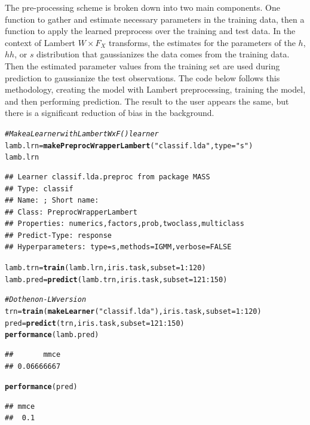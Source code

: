 \documentclass[12pt]{article}\usepackage[]{graphicx}\usepackage[]{color}
\makeatletter
\newcommand{\hlnum}[1]{\textcolor[rgb]{0.686,0.059,0.569}{#1}}%
\newcommand{\hlstr}[1]{\textcolor[rgb]{0.192,0.494,0.8}{#1}}%
\newcommand{\hlcom}[1]{\textcolor[rgb]{0.678,0.584,0.686}{\textit{#1}}}%
\newcommand{\hlopt}[1]{\textcolor[rgb]{0,0,0}{#1}}%
\newcommand{\hlstd}[1]{\textcolor[rgb]{0.345,0.345,0.345}{#1}}%
\newcommand{\hlkwb}[1]{\textcolor[rgb]{0.69,0.353,0.396}{#1}}%
\newcommand{\hlkwc}[1]{\textcolor[rgb]{0.333,0.667,0.333}{#1}}%
\newcommand{\hlkwd}[1]{\textcolor[rgb]{0.737,0.353,0.396}{\textbf{#1}}}%
\newenvironment{kframe}{%
 \def\at@end@of@kframe{}%
 \ifinner\ifhmode%
  \def\at@end@of@kframe{\end{minipage}}%
  \begin{minipage}{\columnwidth}%
 \fi\fi%
 \def\FrameCommand##1{\hskip\@totalleftmargin \hskip-\fboxsep
 \colorbox{shadecolor}{##1}\hskip-\fboxsep
     \hskip-\linewidth \hskip-\@totalleftmargin \hskip\columnwidth}%
 \MakeFramed {\advance\hsize-\width
   \@totalleftmargin\z@ \linewidth\hsize
   \@setminipage}}%
 {\par\unskip\endMakeFramed%
 \at@end@of@kframe}
\newenvironment{knitrout}{}{} %
\theoremstyle{definition}
\makeatother
\begin{document}
The pre-processing scheme is broken down into two main components. One function to gather and estimate necessary parameters in the training data, then a function to apply the learned preprocess over the training and test data. In the context of Lambert $W\times F_X$ transforms, the estimates for the parameters of the $h$, $hh$, or $s$ distribution that gaussianizes the data comes from the training data. Then the estimated parameter values from the training set are used during prediction to gaussianize the test observations. The code below follows this methodology, creating the model with Lambert preprocessing, training the model, and then performing prediction. The result to the user appears the same, but there is a significant reduction of bias in the background.

\singlespacing
\begin{knitrout}
\color{fgcolor}\begin{kframe}
\begin{alltt}
\hlcom{# Make a Learner with Lambert WxF() learner }
\hlstd{lamb.lrn} \hlkwb{=} \hlkwd{makePreprocWrapperLambert}\hlstd{(}\hlstr{"classif.lda"}\hlstd{,} \hlkwc{type} \hlstd{=} \hlstr{"s"}\hlstd{)}
\hlstd{lamb.lrn}
\end{alltt}
\begin{verbatim}
## Learner classif.lda.preproc from package MASS
## Type: classif
## Name: ; Short name: 
## Class: PreprocWrapperLambert
## Properties: numerics,factors,prob,twoclass,multiclass
## Predict-Type: response
## Hyperparameters: type=s,methods=IGMM,verbose=FALSE
\end{verbatim}
\begin{alltt}
\hlstd{lamb.trn} \hlkwb{=} \hlkwd{train}\hlstd{(lamb.lrn,iris.task,} \hlkwc{subset} \hlstd{=} \hlnum{1}\hlopt{:}\hlnum{120}\hlstd{)}
\hlstd{lamb.pred} \hlkwb{=} \hlkwd{predict}\hlstd{(lamb.trn, iris.task,} \hlkwc{subset} \hlstd{=} \hlnum{121}\hlopt{:}\hlnum{150}\hlstd{)}

\hlcom{# Do the non-LW version}
\hlstd{trn} \hlkwb{=} \hlkwd{train}\hlstd{(}\hlkwd{makeLearner}\hlstd{(}\hlstr{"classif.lda"}\hlstd{),iris.task,} \hlkwc{subset} \hlstd{=} \hlnum{1}\hlopt{:}\hlnum{120}\hlstd{)}
\hlstd{pred} \hlkwb{=} \hlkwd{predict}\hlstd{(trn, iris.task,} \hlkwc{subset} \hlstd{=} \hlnum{121}\hlopt{:}\hlnum{150}\hlstd{)}
\hlkwd{performance}\hlstd{(lamb.pred)}
\end{alltt}
\begin{verbatim}
##       mmce 
## 0.06666667
\end{verbatim}
\begin{alltt}
\hlkwd{performance}\hlstd{(pred)}
\end{alltt}
\begin{verbatim}
## mmce 
##  0.1
\end{verbatim}
\end{kframe}
\end{knitrout}
\doublespacing
\end{document}
